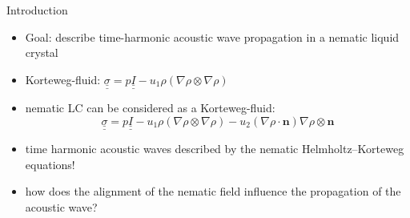 \documentclass[11pt,aspectratio=169,xcolor=dvipsnames]{beamer}
\newcommand{\nicearrow}[2]{\raisebox{#2}{\resizebox{0.45cm}{!}{\color{#1}{\MVRightArrow}\color{black}}}}
\begin{document}
\begin{frame}{Introduction}
  \begin{minipage}{0.7\textwidth}
    \begin{itemize}
      \item \alert{Goal:} describe time-harmonic acoustic wave propagation in a \alert{nematic liquid crystal} 
      \item<2-> Korteweg-fluid: $\underline{\underline{\sigma}} = p \underline{\underline{I}} - u_1 \rho (\nabla \rho \otimes \nabla \rho)$
      \item<3-> nematic LC can be considered as a Korteweg-fluid:
      \begin{equation*}
        \underline{\underline{\sigma}} = p \underline{\underline{I}} - u_1 \rho (\nabla \rho \otimes \nabla \rho) - u_2 (\nabla \rho \cdot \bm{n}) \nabla \rho \otimes \bm{n}
      \end{equation*}
      \item<4->[\nicearrow{GOE}{-0.07cm}] time harmonic acoustic waves described by the \alert{nematic Helmholtz--Korteweg} equations! 
      \item<4->[\nicearrow{GOE}{-0.07cm}] how does the alignment of the nematic field influence the propagation of the acoustic wave? 
    \end{itemize}
  \end{minipage}
  \hfill
  \begin{minipage}{0.29\textwidth}
    \begin{center}
    \end{center}
  \end{minipage}
\end{frame}
\end{document}
